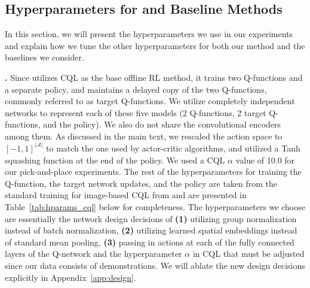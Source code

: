\documentclass[../thesis.tex]{subfiles}
\begin{document}


\subsection{Hyperparameters for \ptrmethodname and Baseline Methods}
\label{app:hyperparams}

In this section, we will present the hyperparameters we use in our experiments and explain how we tune the other hyperparameters for both our method \ptrmethodname and the baselines we consider.  

\textbf{\ptrmethodname.} Since \ptrmethodname utilizes CQL as the base offline RL method, it trains two Q-functions and a separate policy, and maintains a delayed copy of the two Q-functions, commonly referred to as target Q-functions. We utilize completely independent networks to represent each of these five models (2 Q-functions, 2 target Q-functions, and the policy). We also do not share the convolutional encoders among them. As discussed in the main text, we rescaled the action space to $[-1, 1]^{|\mathcal{A}|}$ to match the one used by actor-critic algorithms, and utilized a Tanh squashing function at the end of the policy. We used a CQL $\alpha$ value of 10.0 for our pick-and-place experiments. The rest of the hyperparameters for training the Q-function, the target network updates, and the policy are taken from the standard training for image-based CQL from \citet{singh2020cog} and are presented in Table~\ref{tab:hparams_cql} below for completeness. The hyperparameters we choose are essentially the network design decisions of \textbf{(1)} utilizing group normalization instead of batch normalization, \textbf{(2)} utilizing learned spatial embeddings instead of standard mean pooling, \textbf{(3)} passing in actions at each of the fully connected layers of the Q-network and the hyperparameter $\alpha$ in CQL that must be adjusted since our data consists of demonstrations. We will ablate the new design decisions explicitly in Appendix~\ref{app:design}.
\end{document}
